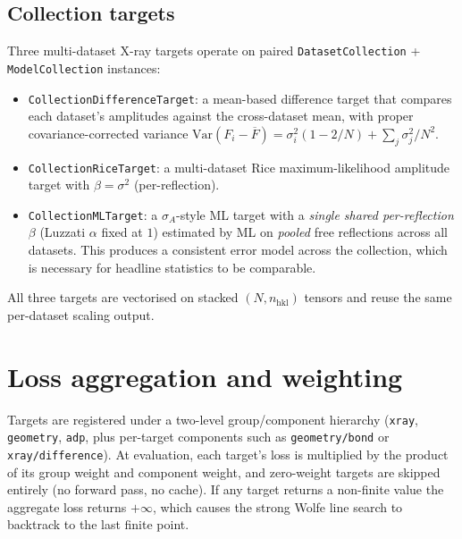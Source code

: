 \documentclass{iucrjournals}
\begin{document}
\subsection{Collection targets}

Three multi-dataset X-ray targets operate on paired
\texttt{DatasetCollection} + \texttt{ModelCollection} instances:
%
\begin{itemize}
\item \texttt{CollectionDifferenceTarget}: a mean-based difference
  target that compares each dataset's amplitudes against the
  cross-dataset mean, with proper covariance-corrected variance
  $\mathrm{Var}(F_{i} - \overline{F})
  = \sigma_{i}^{2}(1 - 2/N) + \sum_{j}\sigma_{j}^{2}/N^{2}$.
\item \texttt{CollectionRiceTarget}: a multi-dataset Rice
  maximum-likelihood amplitude target with
  $\beta = \sigma^{2}$ (per-reflection).
\item \texttt{CollectionMLTarget}: a $\sigma_{A}$-style ML target with
  a \emph{single shared per-reflection $\beta$} (Luzzati $\alpha$ fixed
  at $1$) estimated by ML on \emph{pooled} free reflections across all
  datasets.  This produces a consistent error model across the
  collection, which is necessary for headline statistics to be
  comparable.
\end{itemize}
%
All three targets are vectorised on stacked $(N, n_\mathrm{hkl})$ tensors
and reuse the same per-dataset scaling output.


\section{Loss aggregation and weighting}

Targets are registered under a two-level group/component hierarchy
(\texttt{xray}, \texttt{geometry}, \texttt{adp}, plus per-target
components such as \texttt{geometry/bond} or
\texttt{xray/difference}).  At evaluation, each target's loss is
multiplied by the product of its group weight and component weight, and
zero-weight targets are skipped entirely (no forward pass, no cache).
If any target returns a non-finite value the aggregate loss returns
$+\infty$, which causes the strong Wolfe line search to backtrack to
the last finite point.
\end{document}
